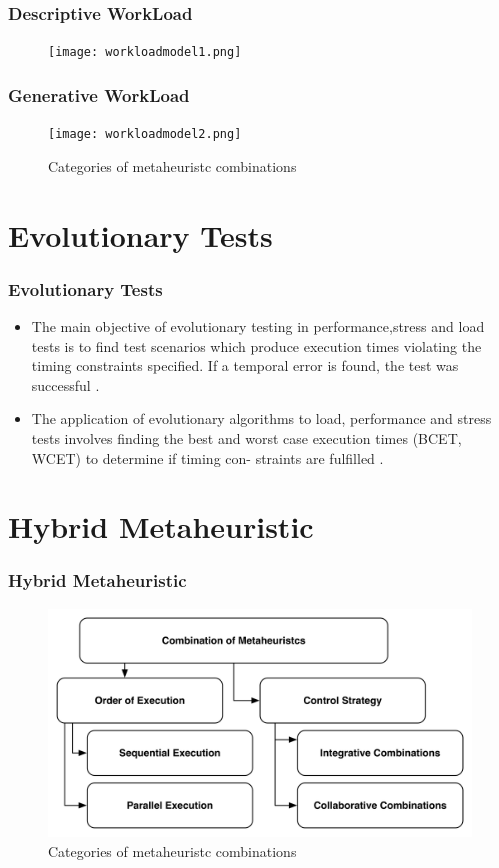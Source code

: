 \documentclass{beamer}
\begin{document}
\begin{frame}
\frametitle{Descriptive WorkLoad}
\begin{figure}[H]
\centering
\texttt{[image: workloadmodel1.png]}
\end{figure}
\end{frame}


\begin{frame}
\frametitle{Generative WorkLoad}
\begin{figure}[H]
\centering
\texttt{[image: workloadmodel2.png]}
\caption{Categories of metaheuristc combinations}
\end{figure}
\end{frame}


\section{Evolutionary Tests}

\begin{frame}
\frametitle{Evolutionary Tests}

\begin{itemize}
\item The main objective of evolutionary testing in performance,stress and load tests is to find test scenarios which produce execution times violating the timing constraints specified. If a temporal error is found, the test was successful \cite{Sullivan}. 

\item The application of evolutionary algorithms to load, performance and stress tests involves finding the best and worst case execution times (BCET, WCET) to determine if timing con- straints are fulfilled \cite{Afzal2009}.
\end{itemize}

\end{frame}


\section{Hybrid Metaheuristic}

\begin{frame}
\frametitle{Hybrid Metaheuristic}
\begin{figure}[H]
\centering
\includegraphics[width=1\linewidth]{metaheuristc2.png}
\caption{Categories of metaheuristc combinations}
\end{figure}
\end{frame}
\end{document}
